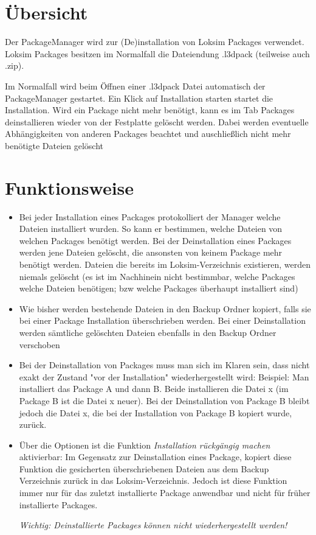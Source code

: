 \section{Übersicht}

Der PackageManager wird zur (De)installation von Loksim Packages
verwendet. Loksim Packages besitzen im Normalfall die Dateiendung
.l3dpack (teilweise auch .zip).

Im Normalfall wird beim Öffnen einer .l3dpack Datei automatisch der
PackageManager gestartet. Ein Klick auf Installation starten startet die
Installation. Wird ein Package nicht mehr benötigt, kann es im Tab
Packages deinstallieren wieder von der Festplatte gelöscht werden. Dabei
werden eventuelle Abhängigkeiten von anderen Packages beachtet und
auschließlich nicht mehr benötigte Dateien gelöscht

\section{Funktionsweise}

\begin{itemize}
\itemsep1pt\parskip0pt
\item
  Bei jeder Installation eines Packages protokolliert der Manager welche
  Dateien installiert wurden. So kann er bestimmen, welche Dateien von
  welchen Packages benötigt werden. Bei der Deinstallation eines
  Packages werden jene Dateien gelöscht, die ansonsten von keinem
  Package mehr benötigt werden. Dateien die bereits im
  Loksim-Verzeichnis existieren, werden niemals gelöscht (es ist im
  Nachhinein nicht bestimmbar, welche Packages welche Dateien benötigen;
  bzw welche Packages überhaupt installiert sind)
\item
  Wie bisher werden bestehende Dateien in den Backup Ordner kopiert,
  falls sie bei einer Package Installation überschrieben werden. Bei
  einer Deinstallation werden sämtliche gelöschten Dateien ebenfalls in
  den Backup Ordner verschoben
\item
  Bei der Deinstallation von Packages muss man sich im Klaren sein, dass
  nicht exakt der Zustand "vor der Installation" wiederhergestellt wird:
  Beispiel: Man installiert das Package A und dann B. Beide installieren
  die Datei x (im Package B ist die Datei x neuer). Bei der
  Deinstallation von Package B bleibt jedoch die Datei x, die bei der
  Installation von Package B kopiert wurde, zurück.
\item
  Über die Optionen ist die Funktion  \emph{Installation rückgängig machen} aktivierbar: Im Gegensatz zur Deinstallation eines Package, kopiert
  diese Funktion die gesicherten überschriebenen Dateien aus dem Backup
  Verzeichnis zurück in das Loksim-Verzeichnis. Jedoch ist diese
  Funktion immer nur für das zuletzt installierte Package anwendbar und
  nicht für früher installierte Packages.

 \emph{Wichtig:  Deinstallierte Packages können nicht wiederhergestellt werden!}
\end{itemize}

